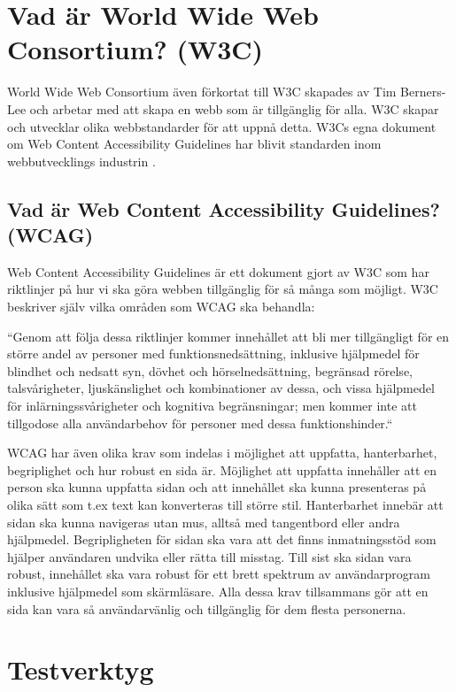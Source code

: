 \documentclass[11p]{article}
\begin{document}
    \section{Vad är World Wide Web Consortium? (W3C)}
    World Wide Web Consortium även förkortat till W3C skapades av Tim Berners-Lee och arbetar med att skapa en webb som är tillgänglig för alla.
    W3C skapar och utvecklar olika webbstandarder för att uppnå detta.
    W3Cs egna dokument om Web Content Accessibility Guidelines har blivit standarden inom webbutvecklings industrin \textcite{W3C}.

    \subsection{Vad är Web Content Accessibility Guidelines? (WCAG)}
    Web Content Accessibility Guidelines är ett dokument gjort av W3C som har riktlinjer på hur vi ska göra webben tillgänglig för så många som möjligt.
    W3C beskriver själv vilka områden som WCAG ska behandla:

    ``Genom att följa dessa riktlinjer kommer innehållet att bli mer tillgängligt för en större andel av personer med funktionsnedsättning, inklusive hjälpmedel för blindhet och nedsatt syn, dövhet och hörselnedsättning, begränsad rörelse, talsvårigheter, ljuskänslighet och kombinationer av dessa, och vissa hjälpmedel för inlärningssvårigheter och kognitiva begränsningar; men kommer inte att tillgodose alla användarbehov för personer med dessa funktionshinder.`` \textcite{WCAG}

    WCAG har även olika krav som indelas i möjlighet att uppfatta, hanterbarhet, begriplighet och hur robust en sida är.
    Möjlighet att uppfatta innehåller att en person ska kunna uppfatta sidan och att innehållet ska kunna presenteras på olika sätt som t.ex text kan konverteras till större stil.
    Hanterbarhet innebär att sidan ska kunna navigeras utan mus, alltså med tangentbord eller andra hjälpmedel.
    Begripligheten för sidan ska vara att det finns inmatningsstöd som hjälper användaren undvika eller rätta till misstag.
    Till sist ska sidan vara robust, innehållet ska vara robust för ett brett spektrum av användarprogram inklusive hjälpmedel som skärmläsare.
    Alla dessa krav tillsammans gör att en sida kan vara så användarvänlig och tillgänglig för dem flesta personerna. \textcite{Digg_2023}

    \section{Testverktyg}
\end{document}
